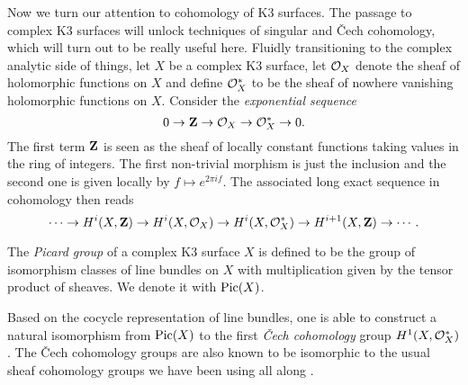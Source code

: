 Now we turn our attention to cohomology of K3 surfaces. The passage to complex K3 surfaces will unlock techniques of singular and Čech cohomology, which will turn out to be really useful here. Fluidly transitioning to the complex analytic side of things, let $X$ be a complex K3 surface, let ${\mathcal{O}_{X}}$ denote the sheaf of holomorphic functions on $X$ and define $\mathcal O_X^*$ to be the sheaf of nowhere vanishing holomorphic functions on $X$. Consider the \emph{exponential sequence}
\[
    0 \to \mathbf Z \to {\mathcal{O}_{X}} \to \mathcal O_X^* \to 0.
\]
The first term $\mathbf Z$ is seen as the sheaf of locally constant functions taking values in the ring of integers. The first non-trivial morphism is just the inclusion and the second one is given locally by $f \mapsto e^{2\pi i f}$. The associated long exact sequence in
cohomology then reads
\begin{equation}
    \label{eq: LES of exponential SES}
    \cdots \to H^{i}(X, \mathbf Z) \to H^{i}(X, {\mathcal{O}_{X}}) \to H^{i}(X, \mathcal O^*_X) \to H^{i+1}(X, \mathbf Z) \to \cdots.
\end{equation}

\begin{definition}
    The \emph{Picard group} of a complex K3 surface $X$ is defined to be the group of isomorphism classes of line bundles on $X$ with multiplication given by the tensor product of sheaves. We denote it with $\operatorname{Pic}(X)$.
\end{definition}

\begin{remark}
    Based on the cocycle representation of line bundles, one is able to construct a natural isomorphism from $\operatorname{Pic}(X)$ to the first \emph{Čech cohomology} group $H^1(X,\mathcal O_X^*)$ \cite[\S 4, Theorem 4.49]{Voisin2002}.
    The Čech cohomology groups are also known to be isomorphic to the usual sheaf cohomology groups we have been using all along \cite[\S 4, Theorem 4.44]{Voisin2002}.
\end{remark}

